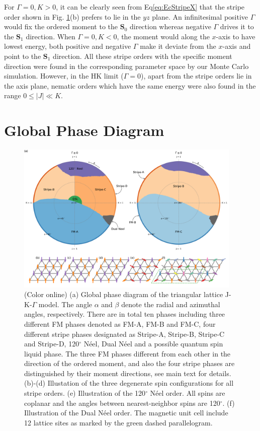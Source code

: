 \documentclass[aps,prb,reprint,amsfonts,amsmath,amssymb,showpacs,groupedaddress,superscriptaddress]{revtex4-1}
\begin{document}
For $\Gamma=0, K>0$, it can be clearly seen from Eq\eqref{eq:EcStripeX} that the stripe order shown in Fig. \ref{fig:PhaseDiagram}(b) prefers to lie in the $yz$ plane. An infinitesimal positive $\Gamma$ would fix the ordered moment to the $\mathbf{S}_0$ direction whereas negative $\Gamma$ drives it to the $\mathbf{S}_1$ direction. When $\Gamma=0, K<0$, the moment would along the $x$-axis to have lowest energy, both positive and negative $\Gamma$ make it deviate from the $x$-axis and point to the $\mathbf{S}_1$ direction. All these stripe orders with the specific moment direction were found in the corresponding parameter space by our Monte Carlo simulation. However, in the HK limit ($\Gamma=0$), apart from the stripe orders lie in the axis plane, nematic orders which have the same energy were also found in the range $0 \leq |J| \ll K$.

\section{Global Phase Diagram}
\begin{figure}
    \centering
    \includegraphics[width=0.96\textwidth]{Fig2.pdf}
    \caption{(Color online) (a) Global phase diagram of the triangular lattice J-K-$\Gamma$ model. The angle $\alpha$ and $\beta$ denote the radial and azimuthal angles, respectively. There are in total ten phases including three different FM phases denoted as FM-A, FM-B and FM-C, four different stripe phases designated as Stripe-A, Stripe-B, Stripe-C and Stripe-D, 120$^\circ$ N\'{e}el, Dual N\'{e}el and a possible quantum spin liquid phase. The three FM phases different from each other in the direction of the ordered moment, and also the four stripe phases are distinguished by their moment directions, see main text for details. (b)-(d) Illustation of the three degenerate spin configurations for all stripe orders. (e) Illustration of the 120$^\circ$ N\'{e}el order. All spins are coplanar and the angles between nearest-neighbor spins are 120$^\circ$. (f) Illustration of the Dual N\'{e}el order. The magnetic unit cell include 12 lattice sites as marked by the green dashed parallelogram.}
     \label{fig:PhaseDiagram}
\end{figure}
\end{document}
